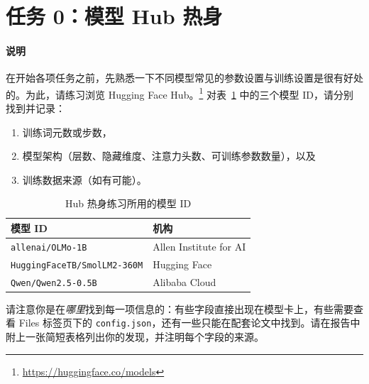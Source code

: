 
\section{任务 0：模型 Hub 热身}
\paragraph{说明} 在开始各项任务之前，先熟悉一下不同模型常见的参数设置与训练设置是很有好处的。为此，请练习浏览 Hugging Face Hub。\footnote{\url{https://huggingface.co/models}}  对表~\ref{tab:hub-warmup} 中的三个模型 ID，请分别找到并记录：
\begin{enumerate}[label=\arabic*.]
    \item 训练词元数或步数，
    \item 模型架构（层数、隐藏维度、注意力头数、可训练参数数量），以及
    \item 训练数据来源（如有可能）。
\end{enumerate}

\begin{table}[h]
\centering

\begin{tabular}{ll}
\toprule
\textbf{模型 ID} & \textbf{机构} \\
\midrule
\texttt{allenai/OLMo-1B}            & Allen Institute for AI \\
\texttt{HuggingFaceTB/SmolLM2-360M} & Hugging Face \\
\texttt{Qwen/Qwen2.5-0.5B}          & Alibaba Cloud \\
\bottomrule
\end{tabular}
\caption{Hub 热身练习所用的模型 ID}
\label{tab:hub-warmup}
\end{table}

请注意你是在\emph{哪里}找到每一项信息的：有些字段直接出现在模型卡上，有些需要查看 Files 标签页下的 \texttt{config.json}，还有一些只能在配套论文中找到。请在报告中附上一张简短表格列出你的发现，并注明每个字段的来源。

